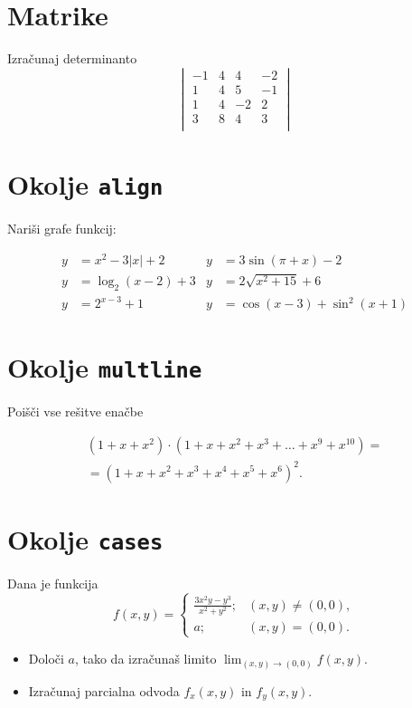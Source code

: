 \documentclass[a4paper,12pt]{article}
\begin{document}
\section*{Matrike}
Izračunaj determinanto
\[
\begin{vmatrix}
 -1 & 4 & 4 & -2 \\
 1 & 4 & 5 & -1 \\
 1 & 4 & -2 & 2 \\
 3 & 8 & 4 & 3 \\
\end{vmatrix}
\]

\section*{Okolje \texttt{align}}
Nariši grafe funkcij:

\begin{align*}
y &= x^2 - 3|x| + 2   & y &= 3 \sin(\pi+x) - 2 \\
y &= \log_2(x-2) + 3  & y &= 2 \sqrt{x^2+15} + 6 \\
y &= 2^{x-3} + 1      & y &= \cos(x-3) + \sin^2(x+1)
\end{align*}


\section*{Okolje \texttt{multline}}
Poišči vse rešitve enačbe

\begin{multline*}
(1+x+x^2) \cdot (1+x+x^2+x^3+\ldots+x^9+x^{10}) = \\
=(1+x+x^2+x^3+x^4+x^5+x^6)^2.
\end{multline*}


\section*{Okolje \texttt{cases}}
Dana je funkcija
\[
f(x,y) = \begin{cases}
    \frac{3x^2y-y^3}{x^2+y^2}; & (x,y) \neq (0,0), \\
    a; & (x,y) = (0,0).
  \end{cases}
\]
\begin{itemize}
\item Določi \(a\), tako da izračunaš limito \( \lim_{(x,y)\to(0,0)} f(x,y) \).
\item Izračunaj parcialna odvoda \(f_x(x,y)\) in \(f_y(x,y)\).
\end{itemize}
\end{document}
